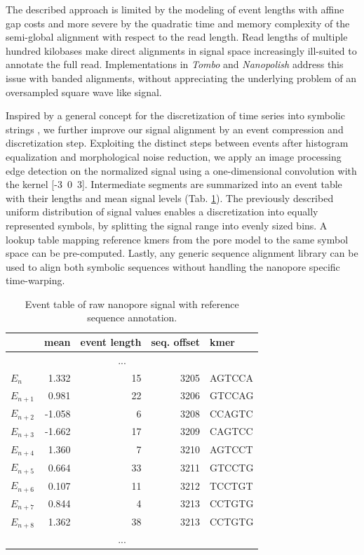 The described approach is limited by the modeling of event lengths with affine gap costs and more severe by the quadratic time and memory complexity of the semi-global alignment with respect to the read length. 
Read lengths of multiple hundred kilobases make direct alignments in signal space increasingly ill-suited to annotate the full read. 
Implementations in \textit{Tombo} and \textit{Nanopolish} \cite{Simpson2017, Gamaarachchi2020} address this issue with banded alignments, without appreciating the underlying problem of an oversampled square wave like signal.

Inspired by a general concept for the discretization of time series into symbolic strings \cite{Lin2003}, we further improve our signal alignment by an event compression and discretization step. Exploiting the distinct steps between events after histogram equalization and morphological noise reduction, we apply an image processing edge detection on the normalized signal using a one-dimensional convolution with the kernel [-3\ 0\ 3]. 
Intermediate segments are summarized into an event table with their lengths and mean signal levels (Tab. \ref{tab:signal:events}). 
The previously described uniform distribution of signal values enables a discretization into equally represented symbols, by splitting the signal range into evenly sized bins. 
A lookup table mapping reference kmers from the pore model to the same symbol space can be pre-computed. 
Lastly, any generic sequence alignment library can be used to align both symbolic sequences without handling the nanopore specific time-warping.


\begin{table}[ht]
	\centering
	\caption[Event detection and annotation]{Event table of raw nanopore signal with reference sequence annotation.}
	\label{tab:signal:events}
	\begin{tabular}{l|r|r|r|l}
		& mean & event length & seq. offset & kmer \\
		\hline 
		& \multicolumn{3}{c|}{...} &  \\
		\hline
		$ E_{n} $ &  1.332  & 15 & 3205 & AGTCCA \\
		\rowcolor{LightOrange}
		$ E_{n+1} $ &  0.981  & 22 & 3206 & GTCCAG \\
		$ E_{n+2} $ & -1.058  &  6 & 3208 & CCAGTC \\
		$ E_{n+3} $ & -1.662  & 17 & 3209 & CAGTCC \\
		$ E_{n+4} $ &  1.360  &  7 & 3210 & AGTCCT \\
		$ E_{n+5} $ &  0.664  & 33 & 3211 & GTCCTG \\
		$ E_{n+6} $ &  0.107  & 11 & 3212 & TCCTGT \\
		\rowcolor{LightGreen}
		$ E_{n+7} $ &  0.844  &  4 & 3213 & CCTGTG \\
		\rowcolor{LightGreen}
		$ E_{n+8} $ &  1.362  & 38 & 3213 & CCTGTG \\
		\hline
		& \multicolumn{3}{c|}{...} &  \\
	\end{tabular} 
\end{table}


